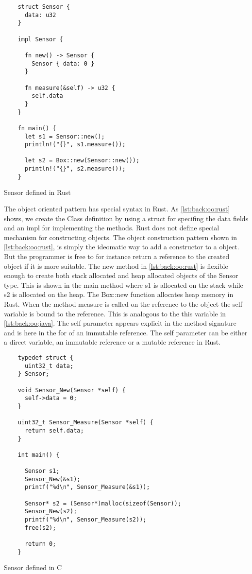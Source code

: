\begin{listing}[H]
  \begin{verbatim}
    struct Sensor {
      data: u32
    }

    impl Sensor {

      fn new() -> Sensor {
        Sensor { data: 0 }
      }

      fn measure(&self) -> u32 {
        self.data
      }
    }

    fn main() {
      let s1 = Sensor::new();
      println!("{}", s1.measure());

      let s2 = Box::new(Sensor::new());
      println!("{}", s2.measure());
    }
  \end{verbatim}
  \caption{Sensor defined in Rust}
  \label{lst:back:oo:rust}
\end{listing}

The object oriented pattern has special syntax in Rust.
As \autoref{lst:back:oo:rust} shows, we create the Class definition by using a struct for specifing the data fields and an impl for implementing the methods.
Rust does not define special mechanism for constructing objects.
The object construction pattern shown in \autoref{lst:back:oo:rust}, is simply the ideomatic way to add a constructor to a object.
But the programmer is free to for instance return a reference to the created object if it is more suitable.
The new method in \autoref{lst:back:oo:rust} is flexible enough to create both stack allocated and heap allocated objects of the Sensor type.
This is shown in the main method where s1 is allocated on the stack while s2 is allocated on the heap.
The Box::new function allocates heap memory in Rust.
When the method measure is called on the reference to the object the self variable is bound to the reference.
This is analogous to the this variable in \autoref{lst:back:oo:java}.
The self parameter appears explicit in the method signature and is here in the for of an immutable reference.
The self parameter can be either a direct variable, an immutable reference or a mutable reference in Rust.

\begin{listing}[H]
  \begin{verbatim}
    typedef struct {
      uint32_t data;
    } Sensor;

    void Sensor_New(Sensor *self) {
      self->data = 0;
    }

    uint32_t Sensor_Measure(Sensor *self) {
      return self.data;
    }

    int main() {

      Sensor s1;
      Sensor_New(&s1);
      printf("%d\n", Sensor_Measure(&s1));

      Sensor* s2 = (Sensor*)malloc(sizeof(Sensor));
      Sensor_New(s2);
      printf("%d\n", Sensor_Measure(s2));
      free(s2);

      return 0;
    }
  \end{verbatim}
  \caption{Sensor defined in C}
  \label{lst:back:oo:c}
\end{listing}

